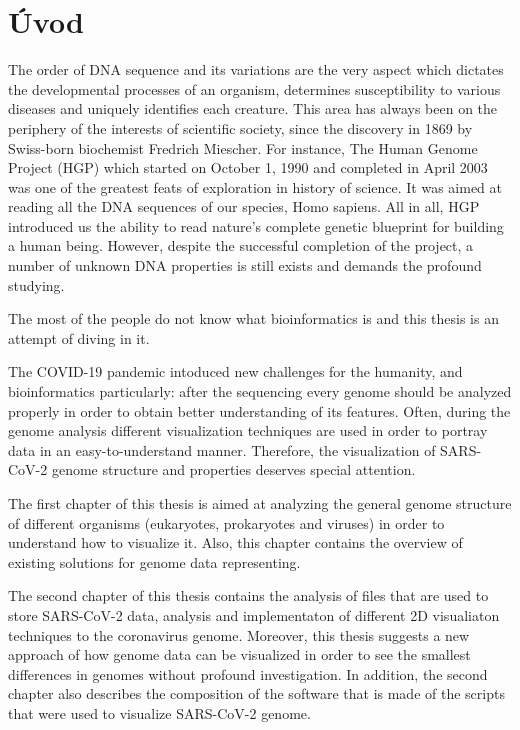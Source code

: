 
{}

\chapter*{Úvod}

\par The order of DNA sequence and its variations are the very aspect which dictates the developmental processes of an organism, 
determines susceptibility to various diseases and uniquely identifies each creature. This area has always been on the periphery 
of the interests of scientific society, since the discovery in 1869 by Swiss-born biochemist Fredrich Miescher. 
For instance, The Human Genome Project (HGP) which started on October 1, 1990 and completed in April 2003 was one of the greatest feats 
of exploration in history of science. It was aimed at reading all the DNA sequences of our species, Homo sapiens. All in all, 
HGP introduced us the ability to read nature's complete genetic blueprint for building a human being. 
However, despite the successful completion of the project, a number of unknown DNA properties is still exists and demands the profound studying.

The most of the people do not know what bioinformatics is and this thesis is an attempt of diving in it.

The COVID-19 pandemic intoduced new challenges for the humanity, and bioinformatics particularly: after the sequencing every genome should be analyzed properly in order to obtain better understanding of its features.
Often, during the genome analysis different visualization techniques are used in order to portray data in an easy-to-understand manner.
Therefore, the visualization of SARS-CoV-2 genome structure and properties deserves special attention.

The first chapter of this thesis is aimed at analyzing the general genome structure of different organisms (eukaryotes, prokaryotes and viruses) in order to understand how to visualize it. 
Also, this chapter contains the overview of existing solutions for genome data representing.

The second chapter of this thesis contains the analysis of files that are used to store SARS-CoV-2 data, analysis and implementaton of different 2D visualiaton techniques to the coronavirus genome.
Moreover, this thesis suggests a new approach of how genome data can be visualized in order to see the smallest differences in genomes without profound investigation.
In addition, the second chapter also describes the composition of the software that is made of the scripts that were used to visualize SARS-CoV-2 genome.


